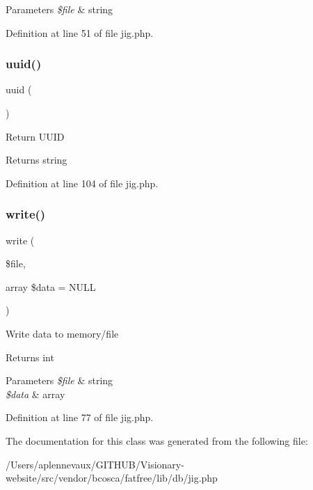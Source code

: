 \begin{DoxyParams}{Parameters}
{\em \$file} & string \\
\hline
\end{DoxyParams}


Definition at line 51 of file jig.\+php.

\hypertarget{class_d_b_1_1_jig_a0a684acda95e124d8596758e4986fe44}{}\label{class_d_b_1_1_jig_a0a684acda95e124d8596758e4986fe44} 
\subsubsection{\texorpdfstring{uuid()}{uuid()}}
{\footnotesize\ttfamily uuid (\begin{DoxyParamCaption}{ }\end{DoxyParamCaption})}

Return U\+U\+ID \begin{DoxyReturn}{Returns}
string 
\end{DoxyReturn}


Definition at line 104 of file jig.\+php.

\hypertarget{class_d_b_1_1_jig_ab5b85afee638474da9c66ecd35d9bee1}{}\label{class_d_b_1_1_jig_ab5b85afee638474da9c66ecd35d9bee1} 
\subsubsection{\texorpdfstring{write()}{write()}}
{\footnotesize\ttfamily write (\begin{DoxyParamCaption}\item[{}]{\$file,  }\item[{array}]{\$data = {\ttfamily NULL} }\end{DoxyParamCaption})}

Write data to memory/file \begin{DoxyReturn}{Returns}
int 
\end{DoxyReturn}

\begin{DoxyParams}{Parameters}
{\em \$file} & string \\
\hline
{\em \$data} & array \\
\hline
\end{DoxyParams}


Definition at line 77 of file jig.\+php.



The documentation for this class was generated from the following file\+:\begin{DoxyCompactItemize}
\item 
/\+Users/aplennevaux/\+G\+I\+T\+H\+U\+B/\+Visionary-\/website/src/vendor/bcosca/fatfree/lib/db/jig.\+php\end{DoxyCompactItemize}
